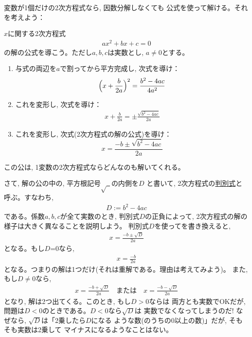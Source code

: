 変数が1個だけの2次方程式なら, 因数分解しなくても
公式を使って解ける。それを考えよう：

\begin{q}\label{q:alg_2eq0} 
 $x$に関する2次方程式
\begin{eqnarray}
ax^2+bx+c=0 \label{eq:2oeq0}
\end{eqnarray}
の解の公式を導こう。ただし$a, b, c$は実数とし, $a \ne 0$とする。
\begin{enumerate}
\item 与式の両辺を$a$で割ってから平方完成し, 次式を導け：
\begin{eqnarray}\Bigl(x+\frac{b}{2a}\Bigr)^2=\frac{b^2-4ac}{4a^2}\end{eqnarray}
\item これを変形し, 次式を導け：
\begin{eqnarray}x+\frac{b}{2a}=\pm\frac{\sqrt{b^2-4ac}}{2a}\end{eqnarray}
\item これを変形し, 次式(2次方程式の解の公式)を導け：
\begin{equation}x=\frac{-b\pm\sqrt{b^2-4ac}}{2a} \label{eq:2oeq}\end{equation}
\end{enumerate}
\end{q}
\mv

この公は, 1変数の2次方程式ならどんなのも解いてくれる。

さて, 解の公の中の, 平方根記号$\sqrt{\,\,\, }$の内側を$D$
と書いて, 2次方程式の\underline{判別式}と呼ぶ。すなわち, 
\begin{eqnarray}D:=b^2-4ac\label{eq:Q(uadratic)_E(quations)_D(iscriminant)}\end{eqnarray}
である。係数$a, b, c$が全て実数のとき, 判別式$D$の正負によって, 
2次方程式の解の様子は大きく異なることを説明しよう。
判別式$D$を使ってを書き換えると, 
\begin{eqnarray}x=\frac{-b\pm\sqrt{D}}{2a}\end{eqnarray}
となる。もし$D$=0なら, 
\begin{eqnarray*}x=\frac{-b}{2a}\end{eqnarray*}
となる。つまりの解は1つだけ(それは重解である。理由は考えてみよう)。
また, もし$D\ne0$なら, 
\begin{eqnarray}
x=\frac{-b+\sqrt{D}}{2a}\quad\text{または}\quad 
x=\frac{-b-\sqrt{D}}{2a}
\label{eq:2oeq_2sols}
\end{eqnarray}
となり, 解は2つ出てくる。このとき, もし$D>0$ならは
両方とも実数でOKだが, 問題は$D<0$のときである。$D<0$なら$\sqrt{D}$は
実数でなくなってしまうのだ! なぜなら, $\sqrt{D}$は「2乗したら$D$になる
ような数(のうちの0以上の数)」だが, そもそも実数は2乗して
マイナスになるようなことはない。

